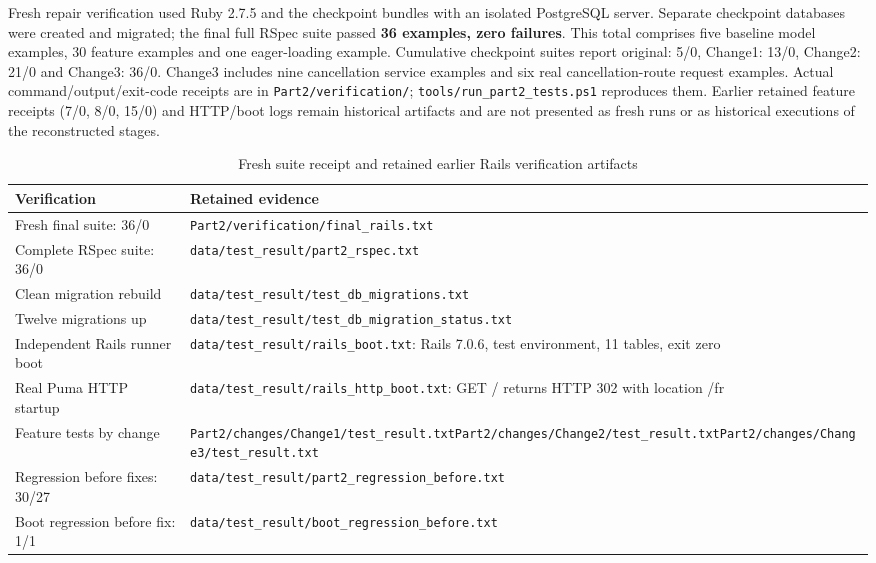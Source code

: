 \documentclass[10pt,a4paper]{article}
\newcommand{\code}[1]{\texttt{\small #1}}
\begin{document}
Fresh repair verification used Ruby 2.7.5 and the checkpoint bundles with an isolated PostgreSQL server. Separate checkpoint databases were created and migrated; the final full RSpec suite passed \textbf{36 examples, zero failures}. This total comprises five baseline model examples, 30 feature examples and one eager-loading example. Cumulative checkpoint suites report original: 5/0, Change1: 13/0, Change2: 21/0 and Change3: 36/0. Change3 includes nine cancellation service examples and six real cancellation-route request examples. Actual command/output/exit-code receipts are in \code{Part2/verification/}; \code{tools/run\_part2\_tests.ps1} reproduces them. Earlier retained feature receipts (7/0, 8/0, 15/0) and HTTP/boot logs remain historical artifacts and are not presented as fresh runs or as historical executions of the reconstructed stages.

\begin{table}[H]
\centering
\caption{Fresh suite receipt and retained earlier Rails verification artifacts}
\begin{tabularx}{\linewidth}{lX}
\toprule
Verification & Retained evidence\\
\midrule
Fresh final suite: 36/0 & \code{Part2/verification/final\_rails.txt}\\
Complete RSpec suite: 36/0 & \code{data/test\_result/part2\_rspec.txt}\\
Clean migration rebuild & \code{data/test\_result/test\_db\_migrations.txt}\\
Twelve migrations up & \code{data/test\_result/test\_db\_migration\_status.txt}\\
Independent Rails runner boot & \code{data/test\_result/rails\_boot.txt}: Rails 7.0.6, test environment, 11 tables, exit zero\\
Real Puma HTTP startup & \code{data/test\_result/rails\_http\_boot.txt}: GET / returns HTTP 302 with location /fr\\
Feature tests by change & \code{Part2/changes/Change1/test\_result.txt}\newline \code{Part2/changes/Change2/test\_result.txt}\newline \code{Part2/changes/Change3/test\_result.txt}\\
Regression before fixes: 30/27 & \code{data/test\_result/part2\_regression\_before.txt}\\
Boot regression before fix: 1/1 & \code{data/test\_result/boot\_regression\_before.txt}\\
\bottomrule
\end{tabularx}
\end{table}
\end{document}
